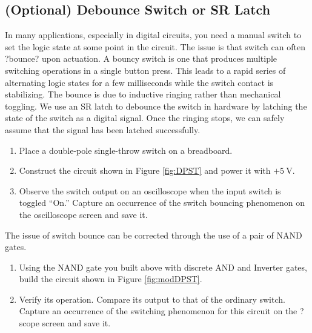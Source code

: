 \documentclass[12pt]{../manual}
\begin{document}
\newpage
\subsection{(Optional) Debounce Switch or SR Latch}
In many applications, especially in digital circuits, you need a manual switch to
set the logic state at some point in the circuit. The issue is that switch can often
?bounce? upon actuation. A bouncy switch is one that produces multiple
switching operations in a single button press. This leads to a rapid series of
alternating logic states for a few milliseconds while the switch contact is
stabilizing. The bounce is due to inductive ringing rather than mechanical
toggling. We use an SR latch to debounce the switch in hardware by latching
the state of the switch as a digital signal. Once the ringing stops, we can safely
assume that the signal has been latched successfully.

\begin{enumerate}
\item Place a double-pole single-throw switch on a breadboard.
\item Construct the circuit shown in Figure \ref{fig:DPST} and power it with $+\SI{5}{\volt}$.
\item Observe the switch output on an oscilloscope when the input switch is
toggled ``On.'' Capture an occurrence of the switch bouncing phenomenon on the oscilloscope screen and save it.
\end{enumerate}

The issue of switch bounce can be corrected through the use of a pair of NAND
gates.

\begin{enumerate}
\item Using the NAND gate you built above with discrete AND and Inverter
gates, build the circuit shown in Figure \ref{fig:modDPST}.
\item Verify its operation. Compare its output to that of the ordinary switch.
Capture an occurrence of the switching phenomenon for this circuit on the ?scope screen and save it.
\end{enumerate}



\newpage
\end{document}
